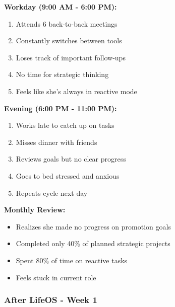 \textbf{Workday (9:00 AM - 6:00 PM):}
\begin{enumerate}
    \item Attends 6 back-to-back meetings
    \item Constantly switches between tools
    \item Loses track of important follow-ups
    \item No time for strategic thinking
    \item Feels like she's always in reactive mode
\end{enumerate}

\textbf{Evening (6:00 PM - 11:00 PM):}
\begin{enumerate}
    \item Works late to catch up on tasks
    \item Misses dinner with friends
    \item Reviews goals but no clear progress
    \item Goes to bed stressed and anxious
    \item Repeats cycle next day
\end{enumerate}

\textbf{Monthly Review:}
\begin{itemize}
    \item Realizes she made no progress on promotion goals
    \item Completed only 40\% of planned strategic projects
    \item Spent 80\% of time on reactive tasks
    \item Feels stuck in current role
\end{itemize}

\subsubsection{After LifeOS - Week 1}


